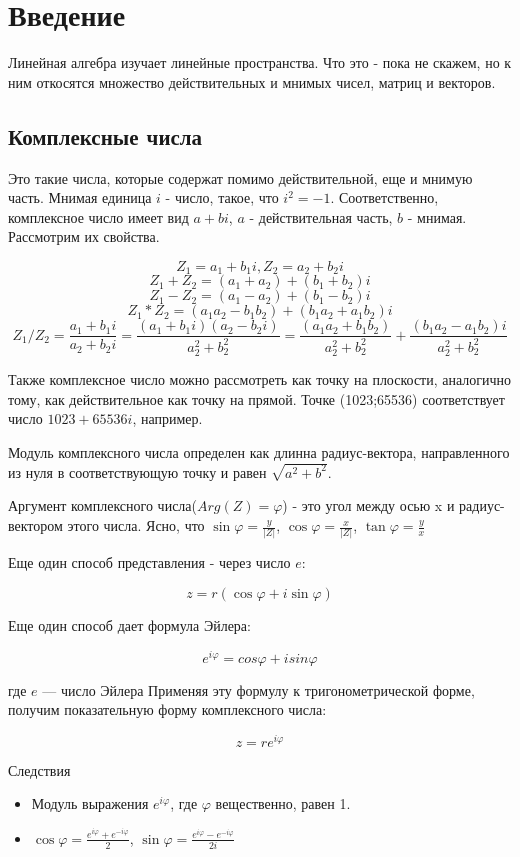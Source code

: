 \documentclass{article}
\begin{document}
\section*{Введение}
Линейная алгебра изучает линейные пространства. Что это - пока не скажем, но к ним откосятся множество действительных и мнимых чисел, матриц и векторов.
\subsection*{Комплексные числа}
Это такие числа, которые содержат помимо действительной, еще и мнимую часть. Мнимая единица $i$ - число, такое, что $i^2=-1$. 
Соответственно, комплексное число имеет вид $a+bi$, $a$ - действительная часть, $b$ - мнимая.
Рассмотрим их свойства.

$$Z_1 = a_1 + b_1i, Z_2 = a_2 + b_2i$$
$$Z_1+Z_2 = (a_1+a_2) + (b_1+b_2)i$$
$$Z_1-Z_2 = (a_1-a_2) + (b_1-b_2)i$$
$$Z_1*Z_2 = (a_1a_2-b_1b_2) + (b_1a_2+a_1b_2)i$$
$$Z_1/Z_2 = \frac{a_1+b_1i}{a_2+b_2i} = \frac{(a_1+b_1i)(a_2-b_2i)}{a_2^2+b_2^2} = \frac{(a_1a_2+b_1b_2)}{a_2^2+b_2^2} + \frac{(b_1a_2-a_1b_2)i}{a_2^2+b_2^2}$$

Также комплексное число можно рассмотреть как точку на плоскости, аналогично тому, как действительное как точку на прямой. 
Точке (1023;65536) соответствует число $1023+65536 i $, например. 

Модуль комплексного числа определен как длинна радиус-вектора, направленного из нуля в соответствующую точку и равен $\sqrt{a^2 + b^2}$.

Аргумент комплексного числа($Arg(Z) = \varphi$) - это угол между осью x и радиус-вектором этого числа. 
Ясно, что $\sin \varphi = \frac y{|Z|}$, $\cos \varphi = \frac x{|Z|}$, $\tan \varphi = \frac yx$

Еще один способ представления - через число  $e$:

    $$z = r (\cos \varphi + i \sin \varphi )$$ 
    
Еще один способ дает формула Эйлера:

    $$e ^{i\varphi}= cos \varphi + i sin \varphi$$
    
где $e$ — число Эйлера
Применяя эту формулу к тригонометрической форме, получим показательную форму комплексного числа:

    $$z = r e ^{i \varphi}$$
   
Следствия
\begin{itemize}
    \item Модуль выражения $e^{i\varphi}$,  где $\varphi$ вещественно, равен 1.
    \item $ \cos \varphi =\frac {e^{i\varphi }+e^{-i\varphi }}{2}$, 
    $ \sin \varphi =\frac {e^{i\varphi }-e^{-i\varphi }}{2i}$
\end{itemize}
\end{document}
